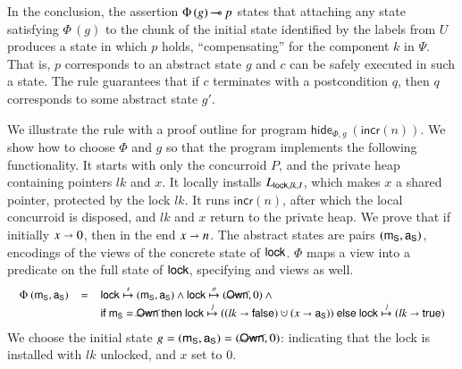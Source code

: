 In the conclusion, the assertion $\Phi\,(g) \mathop{-\!\!\!\!-\!\!\!\ast} p$ states that
attaching any state satisfying $\Phi\,(g)$ to the chunk of the initial
state identified by the labels from $U$ produces a state in which $p$
holds, ``compensating'' for the component $k$ in $\Psi$. That is, $p$
corresponds to an abstract state $g$ and $c$ can be safely executed in
such a state. The rule guarantees that if $c$ terminates with a
postcondition $q$, then $q$ corresponds to some abstract state $g'$.

We illustrate the rule with a proof outline for program
$\mathsf{hide}_{\Phi, g}\ (\mathsf{incr}(n))$. We show how to choose
$\Phi$ and $g$ so that the program implements the following
functionality. It starts with only the concurroid $P$, and the private
heap containing pointers $lk$ and $x$. It locally installs $L_{\mathsf{lock},
  lk, I}$, which makes $x$ a shared pointer, protected by the lock
$lk$. It runs $\mathsf{incr}(n)$, after which the local concurroid is
disposed, and $lk$ and $x$ return to the private heap. We prove that
if initially $x \shortrightarrow 0$, then in the end $x \shortrightarrow n$.
%
The abstract states are pairs $(\mathsf{m}_{{\mathsf{S}}}, \mathsf{a}_{{\mathsf{S}}})$, encodings of the \self
views of the concrete state of $\mathsf{lock}$. $\Phi$ maps a \self view into
a predicate on the full state of $\mathsf{lock}$, specifying \joint and
\other views as well.
%
\[
{\small
\begin{array}{rcl}
  \Phi\ (\mL, \gL) & = & \hlock \spts (\mL, \gL) \aand \hlock \opts (\lockNown, 0) \aand \hbox{}\\
  & & \mathsf{if}\ \mL = \lockNown\ \mathsf{then}\ \hlock \jpts ((lk \hpts
  \mathsf{false)} \hunion (x \hpts \gL))\ \mathsf{else}\ \hlock \jpts (lk \hpts \mathsf{true})
\end{array}
}\]
%
We choose the initial state $g = (\mathsf{m}_{{\mathsf{S}}}, \mathsf{a}_{{\mathsf{S}}}) = (\cancel{\mathsf{Own}}, 0)$:
indicating that the lock is installed with $lk$ unlocked, and $x$ set
to $0$.
%

